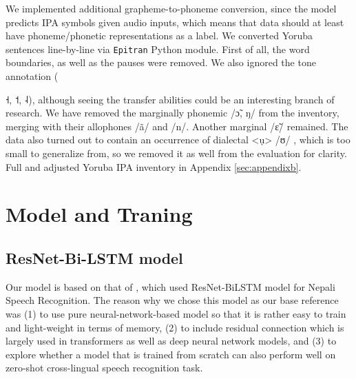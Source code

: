 \documentclass[11pt]{article}
\newcommand{\ipa}[1]{{\ipafont #1}}
\begin{document}
We implemented additional grapheme-to-phoneme conversion, since the model predicts IPA symbols given audio inputs, which means that data should at least have phoneme/phonetic representations as a label. We converted Yoruba sentences line-by-line via \texttt{Epitran} Python module. First of all, the word boundaries, as well as the pauses were removed. We also ignored the tone annotation ({\ipa{˧}, \ipa{˦}, \ipa{˨}), although seeing the transfer abilities could be an interesting branch of research. We have removed the marginally phonemic \ipa{/ɔ̃}, \ipa{ŋ/} from the inventory, merging with their allophones \ipa{/ã/} and \ipa{/n/}. \cite{Przezdziecki2005} Another marginal \ipa{/ɛ̃/} remained. The data also turned out to contain an occurrence of dialectal \ipa{<ụ> /ʊ/} \citet{AllenPulleyblankAjiboye2013}, which is too small to generalize from, so we removed it as well from the evaluation for clarity. Full and adjusted Yoruba IPA inventory in Appendix \ref{sec:appendixb}.

\section{Model and Traning}
\subsection{ResNet-Bi-LSTM model}
Our model is based on that of \cite{dhakal2022automatic}, which used ResNet-BiLSTM model for Nepali Speech Recognition. The reason why we chose this model as our base reference was (1) to use pure neural-network-based model so that it is rather easy to train and light-weight in terms of memory, (2) to include residual connection which is largely used in transformers as well as deep neural network models, and (3) to explore whether a model that is trained from scratch can also perform well on zero-shot cross-lingual speech recognition task.

}
\end{document}
